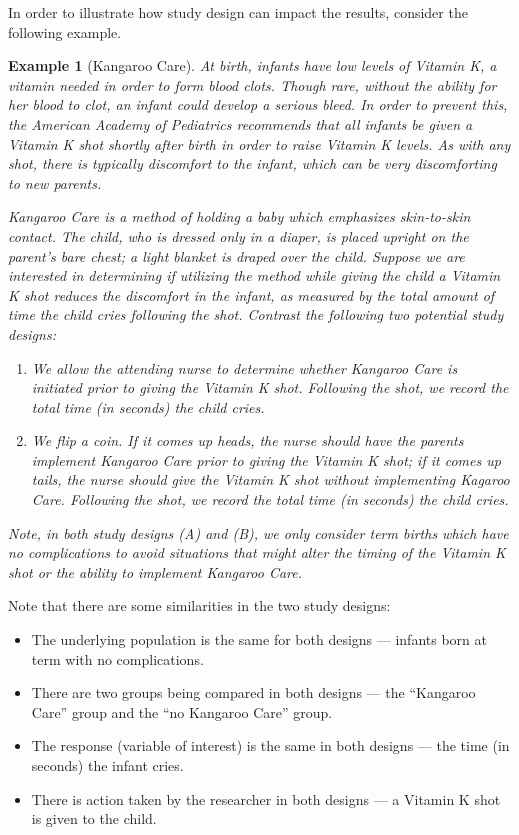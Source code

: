 \documentclass[
]{book}
\providecommand{\tightlist}{%
  \setlength{\itemsep}{0pt}\setlength{\parskip}{0pt}}
\theoremstyle{plain}
\theoremstyle{mydefn}
\theoremstyle{myexmpl}
\newtheorem{example}{Example}[chapter]
\theoremstyle{remark}
\begin{document}
In order to illustrate how study design can impact the results, consider the following example.

\begin{example}[Kangaroo Care]
\protect\hypertarget{exm:data-kangaroo}{}{\label{exm:data-kangaroo} {} }At birth, infants have low levels of Vitamin K, a vitamin needed in order to form blood clots. Though rare, without the ability for her blood to clot, an infant could develop a serious bleed. In order to prevent this, the American Academy of Pediatrics recommends that all infants be given a Vitamin K shot shortly after birth in order to raise Vitamin K levels. As with any shot, there is typically discomfort to the infant, which can be very discomforting to new parents.

Kangaroo Care is a method of holding a baby which emphasizes skin-to-skin contact. The child, who is dressed only in a diaper, is placed upright on the parent's bare chest; a light blanket is draped over the child. Suppose we are interested in determining if utilizing the method while giving the child a Vitamin K shot reduces the discomfort in the infant, as measured by the total amount of time the child cries following the shot. Contrast the following two potential study designs:

\begin{enumerate}
\def\labelenumi{(\Alph{enumi})}
\tightlist
\item
  We allow the attending nurse to determine whether Kangaroo Care is initiated prior to giving the Vitamin K shot. Following the shot, we record the total time (in seconds) the child cries.
\item
  We flip a coin. If it comes up heads, the nurse should have the parents implement Kangaroo Care prior to giving the Vitamin K shot; if it comes up tails, the nurse should give the Vitamin K shot without implementing Kagaroo Care. Following the shot, we record the total time (in seconds) the child cries.
\end{enumerate}

Note, in both study designs (A) and (B), we only consider term births which have no complications to avoid situations that might alter the timing of the Vitamin K shot or the ability to implement Kangaroo Care.
\end{example}

Note that there are some similarities in the two study designs:

\begin{itemize}
\tightlist
\item
  The underlying population is the same for both designs --- infants born at term with no complications.
\item
  There are two groups being compared in both designs --- the ``Kangaroo Care'' group and the ``no Kangaroo Care'' group.
\item
  The response (variable of interest) is the same in both designs --- the time (in seconds) the infant cries.
\item
  There is action taken by the researcher in both designs --- a Vitamin K shot is given to the child.
\end{itemize}
\end{document}
